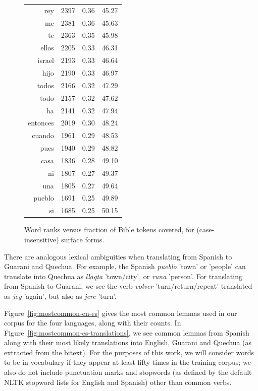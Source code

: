 \begin{figure}
\begin{tiny}
\begin{centering}
\begin{tabular}{|r|c|c|c|}
rey & 2397 & 0.36 & 45.27 \\
me & 2381 & 0.36 & 45.63 \\
te & 2363 & 0.35 & 45.98 \\
ellos & 2205 & 0.33 & 46.31 \\
israel & 2193 & 0.33 & 46.64 \\
hijo & 2190 & 0.33 & 46.97 \\
todos & 2166 & 0.32 & 47.29 \\
todo & 2157 & 0.32 & 47.62 \\
ha & 2141 & 0.32 & 47.94 \\
entonces & 2019 & 0.30 & 48.24 \\
cuando & 1961 & 0.29 & 48.53 \\
pues & 1940 & 0.29 & 48.82 \\
casa & 1836 & 0.28 & 49.10 \\
ni & 1807 & 0.27 & 49.37 \\
una & 1805 & 0.27 & 49.64 \\
pueblo & 1691 & 0.25 & 49.89 \\
si & 1685 & 0.25 & 50.15 \\
\hline
\end{tabular}
\end{centering}
\end{tiny}

  \caption{Word ranks versus fraction of Bible tokens covered, for
  (case-insensitive) surface forms.}
  \label{fig:mostcommon-surface}
\end{figure}

There are analogous lexical ambiguities when translating from Spanish to
Guarani and Quechua.
For example, the Spanish \emph{pueblo} 'town' or 'people' can translate into
Quechua as \emph{llaqta} 'town/city', or \emph{runa} 'person'.
For translating from Spanish to Guarani, we see the verb \emph{volver}
'turn/return/repeat' translated as \emph{jey} 'again', but also as \emph{jere}
'turn'.

Figure~\ref{fig:mostcommon-en-es} gives the most common lemmas used in our
corpus for the four languages, along with their counts. In
Figure~\ref{fig:mostcommon-es-translations}, we see common lemmas from
Spanish along with their most likely translations into English, Guarani and
Quechua (as extracted from the bitext). For the purposes of this work, we will
consider words to be in-vocabulary if they appear at least fifty times in the
training corpus; we also do not include punctuation marks and stopwords (as
defined by the default NLTK stopword lists for English and Spanish) other than
common verbs.

